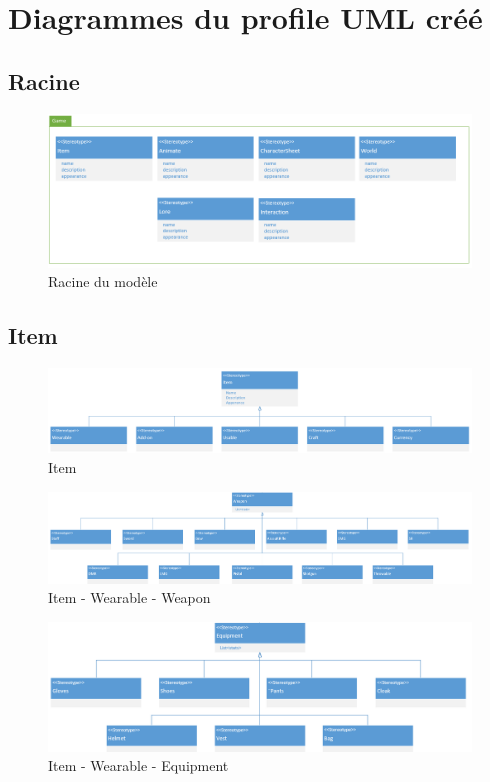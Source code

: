 \appendix
\chapter{Diagrammes du profile UML créé}

\section{Racine}
\begin{figure}[H]
    \includegraphics[width=14cm]{10_img/Z_annexeA/00.PNG} 
    \caption{Racine du modèle}
\end{figure}

\newpage
\section{Item}
\begin{figure}
    \includegraphics[width=20cm]{10_img/Z_annexeA/item_racine.PNG} 
    \caption{Item}
\end{figure}

\newpage
\begin{figure}
    \includegraphics[width=20cm]{10_img/Z_annexeA/item_wearable_weapon.PNG} 
    \caption{Item - Wearable - Weapon}
\end{figure}

\begin{figure}
    \includegraphics[width=20cm]{10_img/Z_annexeA/item_wearable_equipment.PNG} 
    \caption{Item - Wearable - Equipment}
\end{figure}

